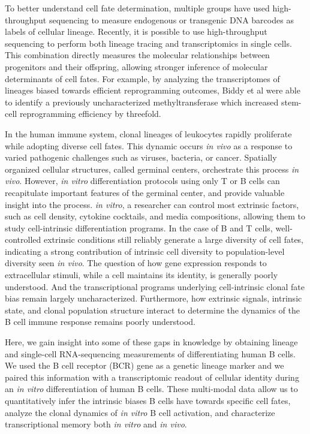 To better understand cell fate determination, multiple groups have used high-throughput sequencing to measure endogenous or transgenic DNA barcodes as labels of cellular lineage\cite{lu_tracking_2011, naik_diverse_2013}. Recently, it is possible to use high-throughput sequencing to perform both lineage tracing and transcriptomics in single cells. This combination directly measures the molecular relationships between progenitors and their offspring, allowing stronger inference of molecular determinants of cell fates\cite{biddy_single-cell_2018, ludwig_lineage_2019, weinreb_lineage_2020}. For example, by analyzing the transcriptomes of lineages biased towards efficient reprogramming outcomes, Biddy et al were able to identify a previously uncharacterized methyltransferase which increased stem-cell reprogramming efficiency by threefold.

In the human immune system, clonal lineages of leukocytes rapidly proliferate while adopting diverse cell fates. This dynamic occurs \textit{in vivo} as a response to varied pathogenic challenges such as viruses, bacteria, or cancer. Spatially organized cellular structures, called germinal centers, orchestrate this process \textit{in vivo}. However, \textit{in vitro} differentiation protocols using only T or B cells can recapitulate important features of the germinal center, and provide valuable insight into the process\cite{deenick_switching_1999}. \textit{in vitro}, a researcher can control most extrinsic factors, such as cell density, cytokine cocktails, and media compositions, allowing them to study cell-intrinsic differentiation programs. In the case of B and T cells, well-controlled extrinsic conditions still reliably generate a large diversity of cell fates, indicating a strong contribution of intrinsic cell diversity to population-level diversity seen \textit{in vivo}\cite{cheon_cyton2_2021}. The question of how gene expression responds to extracellular stimuli, while a cell maintains its identity, is generally poorly understood. And the transcriptional programs underlying cell-intrinsic clonal fate bias remain largely uncharacterized. Furthermore, how extrinsic signals, intrinsic state, and clonal population structure interact to determine the dynamics of the B cell immune response remains poorly understood.

Here, we gain insight into some of these gaps in knowledge by obtaining lineage and single-cell RNA-sequencing measurements of differentiating human B cells. We used the B cell receptor (BCR) gene as a genetic lineage marker and we paired this information with a transcriptomic readout of cellular identity during an \textit{in vitro} differentiation of human B cells. These multi-modal data allow us to quantitatively infer the intrinsic biases B cells have towards specific cell fates, analyze the clonal dynamics of \textit{in vitro} B cell activation, and characterize transcriptional memory both \textit{in vitro} and \textit{in vivo}.

